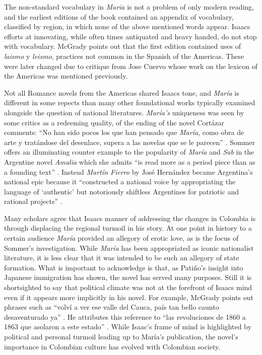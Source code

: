 \documentclass[12pt]{report}
\begin{document}
The non-standard vocabulary in \textit{Maria} is not a problem of only modern reading, and the earliest editions of the book contained an appendix of vocabulary, classified by region, in which none of the above mentioned words appear.
Isaacs efforts at innovating, while often times antiquated and heavy handed, do not stop with vocabulary.
McGrady points out that the first edition contained uses of \textit{laismo} y \textit{leismo}, practices not common in the Spanish of the Americas.
These were later changed due to critique from Jose Cuervo whose work on the lexicon of the Americas was mentioned previously.


Not all Romance novels from the Americas shared Isaacs tone, and \textit{María} is different in some repects than many other foundational works typically examined alongside the question of national literatures.
\textit{María's} uniqueness was seen by some critics as a redeeming quality, of the ending of the novel Cortázar comments: \enquote{No han sido pocos los que han pensado que \textit{María}, como obra de arte y tratándose del desenlace, supera a las novelas que se le parecen} \autocite[57]{Cortazar1908}.
Sommer offers an illuminating counter example to the popularity of \textit{María} and \textit{Sab} in the Argentine novel \textit{Amalia} which she admits \enquote{is read more as a period piece than as a founding text} \autocite[111]{Sommer1991}.
Instead \textit{Martín Fierro} by José Hernández became Argentina's national epic because it \enquote{constructed a national voice by appropriating the language of \enquote{authentic} but notoriously shiftless Argentines for patriotic and rational projects} \autocite[111]{Sommer1991}.


Many scholars agree that Isaacs manner of addressing the changes in Colombia is through displacing the regional turmoil in his story. 
At one point in history to a certain audience \textit{María} provided an allegory of erotic love, as is the focus of Sommer’s investigation. 
While \textit{María} has been appropriated as iconic nationalist literature, it is less clear that it was intended to be such an allegory of state formation.
What is important to acknowledge is that, as Patiño's insight into Japanese immigration has shown, the novel has served many purposes. 
Still it is shortsighted to say that political climate was not at the forefront of Isaacs mind even if it appears more implicitly in his novel.
For example, McGrady points out phrases such as \enquote{volví a ver ese valle del Cauca, país tan bello caunto desaventurado ya} \autocite[314]{McGrady2012}.
He attributes this reference to \enquote{las revoluciones de 1860 a 1863 que asolaron a este estado} \autocite[314]{McGrady2012}.
While Isaac's frame of mind is highlighted by political and personal turmoil leading up to María's publication, the novel's importance in Colombian culture has evolved with Colombian society.
\end{document}
